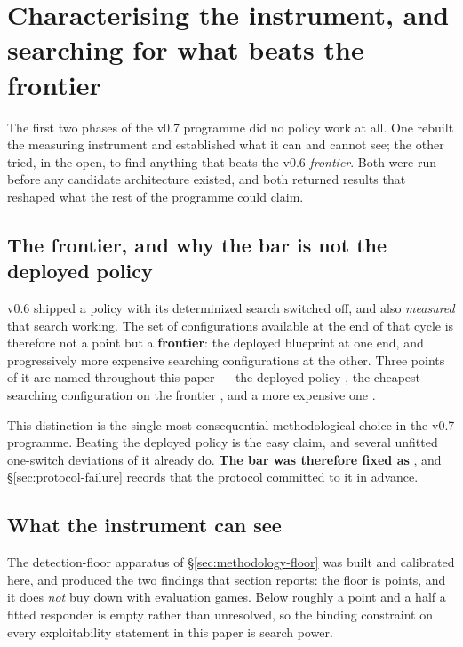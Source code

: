 \section{Characterising the instrument, and searching for what beats the frontier}
\label{sec:instrument}

The first two phases of the v0.7 programme did no policy work at all. One rebuilt the measuring
instrument and established what it can and cannot see; the other tried, in the open, to find
anything that beats the v0.6 \emph{frontier}. Both were run before any candidate architecture
existed, and both returned results that reshaped what the rest of the programme could claim.

\subsection{The frontier, and why the bar is not the deployed policy}
\label{sec:instrument-frontier}

v0.6 shipped a policy with its determinized search switched off, and also \emph{measured} that
search working. The set of configurations available at the end of that cycle is therefore not a
point but a \textbf{frontier}: the deployed blueprint at one end, and progressively more expensive
searching configurations at the other. Three points of it are named throughout this paper --- the
deployed policy \incumbent{}, the cheapest searching configuration on the frontier \fcheap{}, and a
more expensive one \fmid{}.

This distinction is the single most consequential methodological choice in the v0.7 programme.
Beating the deployed policy is the easy claim, and several unfitted one-switch deviations of it
already do. \textbf{The bar was therefore fixed as \fcheap{}}, and \S\ref{sec:protocol-failure}
records that the protocol committed to it in advance.

\subsection{What the instrument can see}
\label{sec:instrument-sees}

The detection-floor apparatus of \S\ref{sec:methodology-floor} was built and calibrated here, and
produced the two findings that section reports: the floor is \vsevenPrimaryFloor{} points, and it
does \emph{not} buy down with evaluation games. Below roughly a point and a half a fitted responder
is empty rather than unresolved, so the binding constraint on every exploitability statement in this
paper is search power.

